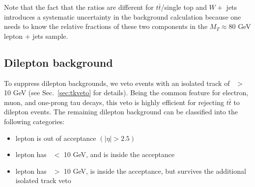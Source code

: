 Note that the fact that the ratios are different for 
$t\bar{t}$/single top and $W +$ jets introduces a systematic
uncertainty in the background calculation because one needs
to know the relative fractions of these two components in 
the $M_T \approx 80$ GeV lepton $+$ jets sample.


\subsection{Dilepton background}
\label{sec:dil-general}

To suppress dilepton backgrounds, we veto events with an isolated track of \pt\ $>$ 10 GeV (see Sec.~\ref{sec:tkveto} for details). 
Being the common feature for electron, muon, and one-prong
tau decays, this veto is highly efficient for rejecting 
$t\bar{t}$ to dilepton events. The remaining dilepton background can be classified into the following categories:

\begin{itemize}
\item lepton is out of acceptance $(|\eta| > 2.5)$
\item lepton has \pt\ $<$ 10 GeV, and is inside the acceptance
\item lepton has \pt\ $>$ 10 GeV, is inside the acceptance, but survives the additional isolated track veto
\end{itemize}



